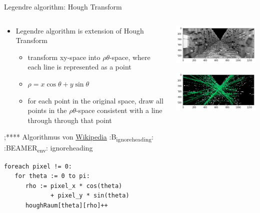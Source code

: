 \documentclass[presentation]{etp-beamer-fancy}
\begin{document}
\begin{frame}[label={sec:orgf9b2e2d},fragile]{Legendre algorithm: Hough Transform}
 \begin{columns}
\begin{column}{.7\columnwidth}
\begin{itemize}
\item Legendre algorithm is extension of \alert{Hough Transform}
\begin{itemize}
\item transform xy-space into \(\rho \theta\)-space, where each line is represented as a point
\item \(\rho = x \cos{\theta} + y \sin{\theta}\)
\item for each point in the original space, draw all points in the \(\rho \theta\)-space
consistent with a line through through that point
\end{itemize}
\end{itemize}
;**** Algorithmus von \href{https://de.wikipedia.org/wiki/Hough-Transformation}{Wikipedia}                           :B\textsubscript{ignoreheading}:
:BEAMER\textsubscript{env}: ignoreheading
\begin{verbatim}
foreach pixel != 0:
   for theta := 0 to pi:
      rho := pixel_x * cos(theta)
             + pixel_y * sin(theta)
      houghRaum[theta][rho]++
\end{verbatim}
\end{column}
\begin{column}{0.3\columnwidth}
\begin{center}
\includegraphics[width=.9\linewidth]{./figures/deathstar_trench_src.png}
\end{center}
\begin{center}
\includegraphics[width=.9\linewidth]{./figures/deathstar_trench_dst.png}

\end{center}
\end{column}
\end{columns}
\end{frame}
\end{document}
